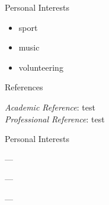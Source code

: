 \documentclass[
	10pt,
]{style} %
\begin{document}
\begin{rSection}{Personal Interests}

	\begin{itemize}
		\item sport
		\item music
		\item volunteering
	\end{itemize}

\end{rSection}


\begin{rSection}{References}

	\textit{Academic Reference}{: test}\\
	\textit{Professional Reference}{: test} \\

\end{rSection}


\begin{rSection}{Personal Interests}
	\begin{rSubsection}{}{}{}{}
		\item ---
		\item ---
		\item ---
	\end{rSubsection}

\end{rSection}
\end{document}
